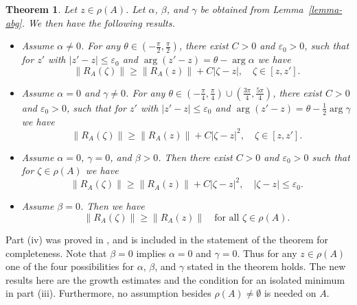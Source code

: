 \documentclass[12pt,a4paper]{article}
\numberwithin{equation}{section}
\theoremstyle{plain}
\newtheorem{theorem}{Theorem}[section]
\theoremstyle{definition}
\newcommand{\abs}[1]{\lvert{#1}\rvert}  %
\newcommand{\norm}[1]{\lVert{#1}\rVert} %
\newcommand{\eps}{\varepsilon}
\DeclareMathOperator{\Arg}{arg}
\begin{document}
\begin{theorem}\label{revthm}
	Let $z\in\rho(A)$. Let $\alpha$, $\beta$, and $\gamma$ be obtained from Lemma~\ref{lemma-abg}. We then have the following results.
	\begin{itemize}
		\item[\textup{(i)}] Assume $\alpha\neq0$. For any $\theta\in (-\tfrac{\pi}{2},\tfrac{\pi}{2})$, there exist $C>0$ and $\eps_0>0$, such that for $z'$ with $\abs{z'-z}\leq\eps_0$ and $\Arg(z'-z) = \theta - \Arg\alpha$ we have
		\begin{equation}\label{result-i}
			\norm{R_A(\zeta)} \geq \norm{R_A(z)} + C\abs{\zeta-z},\quad \zeta\in[z,z'].
		\end{equation}
		\item[\textup{(ii)}] Assume $\alpha=0$ and $\gamma\neq0$. For any $\theta\in (-\tfrac{\pi}{4},\tfrac{\pi}{4})\cup(\tfrac{3\pi}{4},\tfrac{5\pi}{4})$, there exist $C>0$ and $\eps_0>0$, such that for $z'$ with $\abs{z'-z}\leq\eps_0$ and $\Arg(z'-z) = \theta - \tfrac{1}{2}\Arg\gamma$ we have
		\begin{equation}\label{result-ii}
			\norm{R_A(\zeta)} \geq \norm{R_A(z)} + C\abs{\zeta-z}^2,\quad \zeta\in[z,z'].
		\end{equation}
		\item[\textup{(iii)}] Assume $\alpha=0$, $\gamma=0$, and $\beta>0$. Then there exist $C>0$ and $\eps_0>0$ such that for $\zeta\in\rho(A)$ we have
		\begin{equation}\label{result-iii}
			\norm{R_A(\zeta)} \geq \norm{R_A(z)} + C\abs{\zeta-z}^2,\quad \abs{\zeta-z}\leq\eps_0.
		\end{equation}
		\item[\textup{(iv)}] Assume $\beta=0$. Then we have
		\begin{equation}\label{result-iv}
			\norm{R_A(\zeta)}\geq\norm{R_A(z)}\quad \text{for all $\zeta\in\rho(A)$}.
		\end{equation}
	\end{itemize} 
\end{theorem}

Part (iv) was proved in \cite{BS}, and is included in the statement of the theorem for completeness. Note that $\beta=0$ implies $\alpha=0$ and $\gamma=0$. Thus for any $z\in\rho(A)$ one of the four possibilities for $\alpha$, $\beta$, and $\gamma$ stated in the theorem holds. The new results here are the growth estimates and the condition for an isolated minimum in part (iii). Furthermore, no assumption besides $\rho(A)\neq\emptyset$ is needed on $A$.
\end{document}
